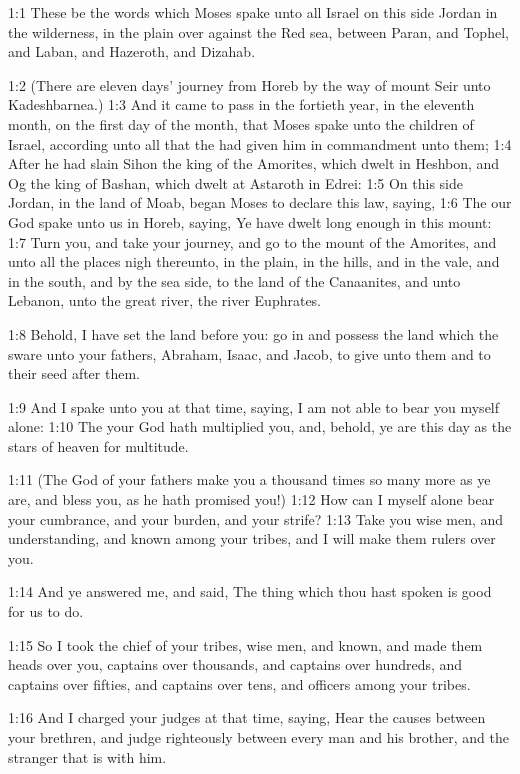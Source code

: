 

1:1 These be the words which Moses spake unto all Israel on this side
Jordan in the wilderness, in the plain over against the Red sea,
between Paran, and Tophel, and Laban, and Hazeroth, and Dizahab.

1:2 (There are eleven days' journey from Horeb by the way of mount
Seir unto Kadeshbarnea.)  1:3 And it came to pass in the fortieth
year, in the eleventh month, on the first day of the month, that Moses
spake unto the children of Israel, according unto all that the \LORD
had given him in commandment unto them; 1:4 After he had slain Sihon
the king of the Amorites, which dwelt in Heshbon, and Og the king of
Bashan, which dwelt at Astaroth in Edrei: 1:5 On this side Jordan, in
the land of Moab, began Moses to declare this law, saying, 1:6 The
\LORD our God spake unto us in Horeb, saying, Ye have dwelt long enough
in this mount: 1:7 Turn you, and take your journey, and go to the
mount of the Amorites, and unto all the places nigh thereunto, in the
plain, in the hills, and in the vale, and in the south, and by the sea
side, to the land of the Canaanites, and unto Lebanon, unto the great
river, the river Euphrates.

1:8 Behold, I have set the land before you: go in and possess the land
which the \LORD sware unto your fathers, Abraham, Isaac, and Jacob, to
give unto them and to their seed after them.

1:9 And I spake unto you at that time, saying, I am not able to bear
you myself alone: 1:10 The \LORD your God hath multiplied you, and,
behold, ye are this day as the stars of heaven for multitude.

1:11 (The \LORD God of your fathers make you a thousand times so many
more as ye are, and bless you, as he hath promised you!)  1:12 How can
I myself alone bear your cumbrance, and your burden, and your strife?
1:13 Take you wise men, and understanding, and known among your
tribes, and I will make them rulers over you.

1:14 And ye answered me, and said, The thing which thou hast spoken is
good for us to do.

1:15 So I took the chief of your tribes, wise men, and known, and made
them heads over you, captains over thousands, and captains over
hundreds, and captains over fifties, and captains over tens, and
officers among your tribes.

1:16 And I charged your judges at that time, saying, Hear the causes
between your brethren, and judge righteously between every man and his
brother, and the stranger that is with him.

